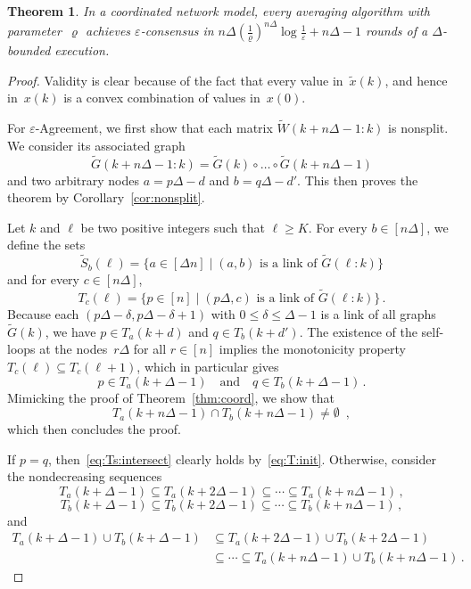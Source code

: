 \documentclass[a4paper]{article}
\theoremstyle{newthm}
\newtheorem{thm}{Theorem}
\renewcommand{\leq}{\leqslant}
\renewcommand{\geq}{\geqslant}
\begin{document}
\begin{thm}\label{thm:coord:delay}
In a coordinated network model, every averaging algorithm with parameter~$\varrho$ achieves $\varepsilon$-consensus
in $n\Delta \left(\frac{1}{\varrho} \right)^{n\Delta} \log
\frac{1}{\varepsilon} + n\Delta-1$ rounds of a $\Delta$-bounded execution.
\end{thm}
\begin{proof}
Validity is clear because of the fact that every value in~$\tilde{x}(k)$, and
	hence in~$x(k)$ is a convex combination of values in~$x(0)$.

For $\varepsilon$-Agreement,  we first show that each matrix $\tilde{W}(k
+n\Delta-1:k)$ 
	is nonsplit.
We consider its associated graph $$\tilde{G}(k +n\Delta-1:k) = \tilde{ G }(k)\circ \dots \circ \tilde{ G}(k +n\Delta-1)$$ 
	and two arbitrary nodes $a = p\Delta -d$  and $b = q\Delta -d'$.
This then proves the theorem by Corollary~\ref{cor:nonsplit}.

\medskip

Let $k$ and $\ell$ be two positive integers such that $\ell \geq K$.
For every $b\in[n\Delta]$, we define the sets
\begin{equation*}
 \tilde{S}_{b}(\ell)
=
\{ a\in[\Delta n] \mid (a,b) \text{ is a link of } \tilde{G}(\ell:k) \}
\end{equation*}
and for every $c\in[n\Delta]$,
\begin{equation*}
T_c(\ell) 
=
\{ p\in[n] \mid (p\Delta,c) \text{ is a link of } \tilde{G}(\ell:k) \} \, .
\end{equation*}
Because each $(p\Delta-\delta,p\Delta-\delta+1)$ with $0\leq \delta\leq \Delta - 1$ 
	is a link of  all graphs~$\tilde{G}(k)$, we have $p\in T_a(k +d)$
and
$q\in T_b(k+d')$.
The existence of the self-loops at the nodes~$r\Delta$ for all $r\in[n]$
implies the monotonicity property $T_c(\ell) \subseteq T_c(\ell + 1)$, which in
particular gives
\begin{equation}\label{eq:T:init}
p\in T_a(k + \Delta - 1) 
\quad \text{and} \quad
q\in T_b(k + \Delta - 1) \, .
\end{equation}
Mimicking the proof of Theorem~\ref{thm:coord}, we show that 
\begin{equation}\label{eq:Ts:intersect}
T_{a}(k + n\Delta - 1)
\cap
T_{b}(k + n\Delta - 1)
\neq
\emptyset
\enspace,
\end{equation}
which then concludes the proof.

If $p=q$, then~\eqref{eq:Ts:intersect} clearly holds by~\eqref{eq:T:init}.
Otherwise, consider the nondecreasing sequences
	$$T_{a}(k+\Delta-1)\subseteq T_{a}(k+2\Delta-1)\subseteq\cdots\subseteq T_{a}(k+n\Delta-1)\, , $$ 
	$$	T_{b}(k+\Delta-1)\subseteq T_{b}(k+2\Delta-1)\subseteq\cdots\subseteq T_{b}(k+n\Delta-1) \, ,$$
and 
\begin{equation*}
\begin{split}
T_{a}(k+\Delta-1)
\cup
T_{b}(k+\Delta-1)
&
\subseteq
T_{a}(k+2\Delta-1)
\cup
T_{b}(k+2\Delta-1)
\\ &
 \subseteq \cdots \subseteq 
T_{a}(k + n\Delta - 1)
\cup
T_{b}(k + n\Delta - 1)
\, .
\end{split}
\end{equation*}


\end{proof}
\end{document}
